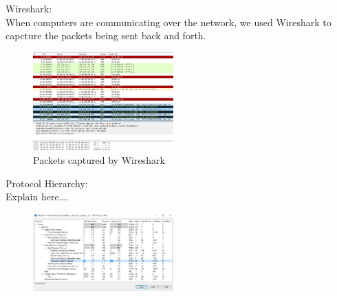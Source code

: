 \documentclass{article}
\begin{document}
Wireshark:\\
When computers are communicating over the network, we used Wireshark to capcture the packets being sent back and forth. 

\begin{figure}[H]
	\begin{center}
		\includegraphics[width=0.48\textwidth]{wireshark.jpg}
	\end{center}
	\caption{Packets captured by Wireshark}
	\label{fig:Prd}
\end{figure}

Protocol Hierarchy:\\
Explain here….


\begin{figure}[H]
	\begin{center}
		\includegraphics[width=0.48\textwidth]{Hierarchyst.jpg}
	\end{center}
	\caption{\small  \newline}
	\label{fig:Prd}
\end{figure}



\end{document}
